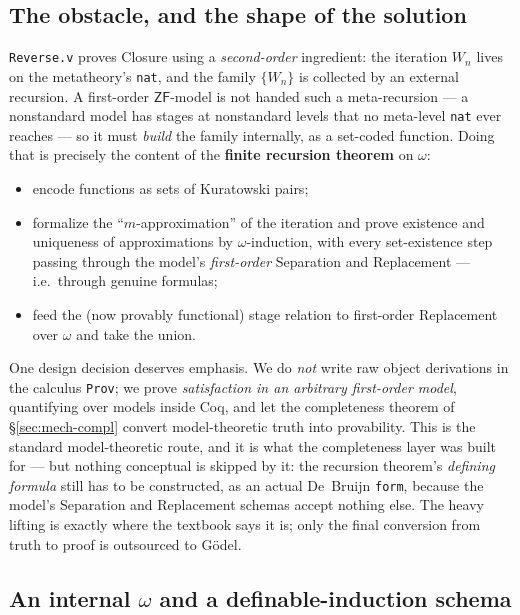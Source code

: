 \documentclass[11pt]{article}
\theoremstyle{plain}
\theoremstyle{definition}
\newcommand{\ZF}{\mathsf{ZF}}
\renewcommand{\ZF}{\textsf{ZF}}
\newcommand{\cq}[1]{\lstinline[basicstyle=\ttfamily]|#1|}
\begin{document}
\subsection{The obstacle, and the shape of the solution}

\texttt{Reverse.v} proves Closure using a \emph{second-order} ingredient: the
iteration $W_n$ lives on the metatheory's \cq{nat}, and the family $\{W_n\}$ is
collected by an external recursion. A first-order $\ZF$-model is not handed such
a meta-recursion --- a nonstandard model has stages at nonstandard levels that no
meta-level \cq{nat} ever reaches --- so it must \emph{build} the family
internally, as a set-coded function. Doing that is precisely the content of the
\textbf{finite recursion theorem} on $\omega$:

\begin{itemize}[leftmargin=1.4em]
\item encode functions as sets of Kuratowski pairs;
\item formalize the ``$m$-approximation'' of the iteration and prove existence
  and uniqueness of approximations by $\omega$-induction, with every
  set-existence step passing through the model's \emph{first-order}
  Separation and Replacement --- i.e.\ through genuine formulas;
\item feed the (now provably functional) stage relation to first-order
  Replacement over $\omega$ and take the union.
\end{itemize}

One design decision deserves emphasis. We do \emph{not} write raw object
derivations in the calculus \cq{Prov}; we prove \emph{satisfaction in an
arbitrary first-order model}, quantifying over models inside Coq, and let the
completeness theorem of \S\ref{sec:mech-compl} convert model-theoretic truth
into provability. This is the standard model-theoretic route, and it is what the
completeness layer was built for --- but nothing conceptual is skipped by it:
the recursion theorem's \emph{defining formula} still has to be constructed, as
an actual De~Bruijn \cq{form}, because the model's Separation and Replacement
schemas accept nothing else. The heavy lifting is exactly where the textbook
says it is; only the final conversion from truth to proof is outsourced to
G\"odel.

\subsection{An internal $\omega$ and a definable-induction schema}
\end{document}
